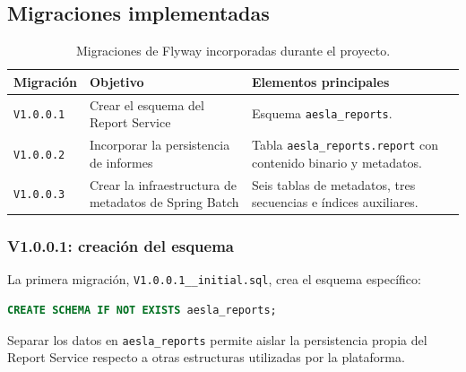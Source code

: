 \documentclass[11pt,a4paper,titlepage,oneside]{report}
\newcommand{\tfgtablestyle}{%
  \small
  \setlength{\tabcolsep}{4pt}%
  \renewcommand{\arraystretch}{1.15}%
  \rowcolors{2}{udcgray!08}{white}%
}
\begin{document}
\subsection{Migraciones implementadas}

\begin{table}[H]
  \centering
  \tfgtablestyle
  \caption{Migraciones de Flyway incorporadas durante el proyecto.}
  \label{tab:migraciones-flyway}

  \begin{tabularx}{0.97\textwidth}
    {@{}p{}p{}X@{}}

    \toprule
    \rowcolor{udcpink!20}

    \textbf{Migración} &
    \textbf{Objetivo} &
    \textbf{Elementos principales} \\

    \midrule

    \texttt{V1.0.0.1} &
    Crear el esquema del Report Service &
    Esquema \texttt{aesla\_reports}. \\

    \texttt{V1.0.0.2} &
    Incorporar la persistencia de informes &
    Tabla \texttt{aesla\_reports.report} con contenido binario y metadatos. \\

    \texttt{V1.0.0.3} &
    Crear la infraestructura de metadatos de Spring Batch &
    Seis tablas de metadatos, tres secuencias e índices auxiliares. \\

    \bottomrule
  \end{tabularx}

\end{table}

\subsubsection{V1.0.0.1: creación del esquema}

La primera migración,
\texttt{V1.0.0.1\_\_initial.sql}, crea el esquema específico:

\begin{lstlisting}[language=SQL, caption={Creación del esquema del Report Service}]
CREATE SCHEMA IF NOT EXISTS aesla_reports;
\end{lstlisting}

Separar los datos en \texttt{aesla\_reports} permite aislar la persistencia
propia del Report Service respecto a otras estructuras utilizadas por la
plataforma.
\end{document}

